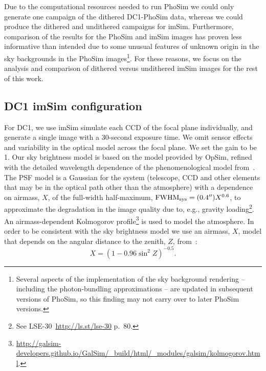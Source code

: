 \documentclass[a4paper,fleqn,usenatbib]{mnras}
\begin{document}
Due to the computational resources needed to run PhoSim we could only generate one campaign of the dithered DC1-PhoSim data, whereas we could produce the dithered and undithered campaigns for imSim. Furthermore, comparison of the results for the PhoSim and imSim images has proven less informative than intended due to some unusual features of unknown origin in the sky backgrounds in the PhoSim images\footnote{Several aspects of the implementation of the sky background rendering -- including the photon-bundling approximations -- are updated in subsequent versions of PhoSim, so this finding may not carry over to later PhoSim versions.}. For these reasons, we focus on the analysis and comparison of dithered versus undithered imSim images for the rest of this work.

\subsection{DC1 imSim configuration}
\label{sec:imsim_pipeline}



For DC1, we use imSim simulate each CCD of the focal plane individually, and generate a single image with a 30-second exposure time. We omit sensor effects and variability in the optical model across the focal plane. We set the gain to be 1. Our sky brightness model is based on the \citet{1991PASP..103.1033K} model provided by OpSim, refined with the detailed wavelength dependence of the phenomenological model from~\citet{2016SPIE.9910E..1AY}. The PSF model is a Gaussian for the system (telescope, CCD and other elements that may be in the optical path other than the atmosphere) with a  dependence on airmass, $X$, of the full-width half-maximum, $\mathrm{FWHM_{sys}} = (0.4\hbox{$^{\prime\prime}$}) X^{0.6}$, to approximate the degradation in the image quality due to, e.g., gravity loading\footnote{See LSE-30~\url{http://ls.st/lse-30} p.~80.}. An airmass-dependent Kolmogorov profile\footnote{\url{http://galsim-developers.github.io/GalSim/_build/html/_modules/galsim/kolmogorov.html}.} is used to model the atmosphere. In order to be consistent with the sky brightness model we use an airmass, $X$, model that depends on the angular distance to the zenith, $Z$, from~\citet{1991PASP..103.1033K}:
\begin{equation}
X = (1 - 0.96\sin^{2}{Z})^{-0.5}.
\end{equation}
\end{document}
